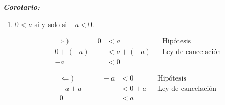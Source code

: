 \documentclass[11pt]{article}
\newcommand{\bfit}[1]{\textbf{\textit{#1}}}
\begin{document}
\begin{enumerate}[label=\alph*)]
    \bfit{Corolario:}
    \begin{enumerate}[label=\roman*)]
        \item $0<a$ si y solo si $-a<0$.
        \begin{center}\vspace{-1em}
            \begin{minipage}[l]{.5\linewidth}
                \begin{align*}
                    \Rightarrow) \qquad \qquad
                    0 &< a && \text{Hipótesis}\\
                    0 + (-a) &< a + (-a) && \text{Ley de cancelación}\\
                    -a &< 0%
                \end{align*}
        \end{minipage}%
        \begin{minipage}[r]{.5\linewidth}
            \begin{align*}
                \Leftarrow) \qquad \qquad
                -a &< 0 && \text{Hipótesis}\\
                -a + a &< 0 + a && \text{Ley de cancelación}\\
                0 &< a%
            \end{align*}
        \end{minipage}
        \end{center}


\end{enumerate}
\end{enumerate}
\end{document}
